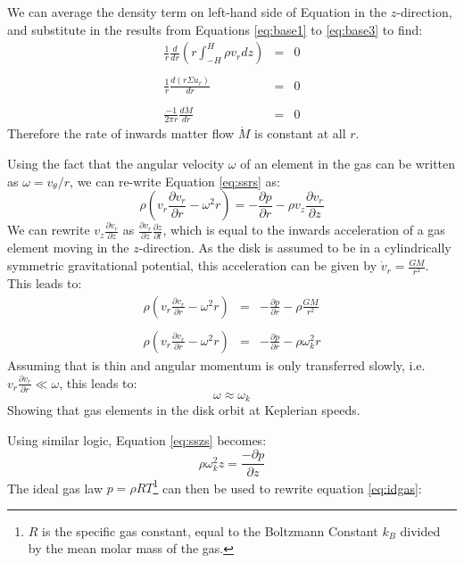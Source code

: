We can average the density term on left-hand side of Equation \label{eq:ssc} in the $z$-direction, and substitute in the results from Equations \ref{eq:base1} to \ref{eq:base3} to find:
\begin{eqnarray}
\frac{1}{r}\frac{d}{dr}\left(r\int_{-H}^H\rho v_rdz\right)&=&0\\\nonumber\\
\frac{1}{r}\frac{d(r\Sigma u_r)}{dr}&=&0\\\nonumber\\
\frac{-1}{2\pi r}\frac{d\dot{M}}{dr}&=&0
\end{eqnarray}
Therefore the rate of inwards matter flow $\dot{M}$ is constant at all $r$.
\par Using the fact that the angular velocity $\omega$ of an element in the gas can be written as $\omega=v_\theta/r$, we can re-write Equation \ref{eq:ssrs} as:
\begin{equation}
\rho\left(v_r\frac{\partial v_r}{\partial r}-\omega^2r\right)=-\frac{\partial p}{\partial r}-\rho v_z\frac{\partial v_r}{\partial z}
\end{equation}
We can rewrite $v_z\frac{\partial v_r}{\partial z}$ as $\frac{\partial v_r}{\partial z}\frac{\partial z}{\partial t}$, which is equal to the inwards acceleration of a gas element moving in the $z$-direction.  As the disk is assumed to be in a cylindrically symmetric gravitational potential, this acceleration can be given by $\dot{v}_r=\frac{GM}{r^2}$.  This leads to:
\begin{eqnarray}
\rho\left(v_r\frac{\partial v_r}{\partial r}-\omega^2r\right)&=&-\frac{\partial p}{\partial r}-\rho\frac{GM}{r^2}\\\nonumber\\
\rho\left(v_r\frac{\partial v_r}{\partial r}-\omega^2r\right)&=&-\frac{\partial p}{\partial r}-\rho\omega_k^2r
\end{eqnarray}
Assuming that is thin and angular momentum is only transferred slowly, i.e. $v_r\frac{\partial v_r}{\partial r}\ll\omega$, this leads to:
\begin{equation}
\omega\approx\omega_k
\end{equation}
Showing that gas elements in the disk orbit at Keplerian speeds.
\par Using similar logic, Equation \ref{eq:sszs} becomes:
\begin{equation}
\rho\omega_k^2 z=\frac{-\partial p}{\partial z}\label{eq:idgas}
\end{equation}
The ideal gas law $p=\rho RT$\footnote{$R$ is the specific gas constant, equal to the Boltzmann Constant $k_B$ divided by the mean molar mass of the gas.} can then be used to rewrite equation \ref{eq:idgas}:
